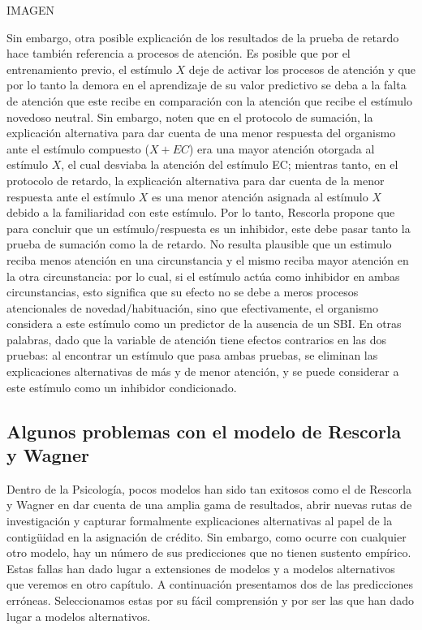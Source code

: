 \documentclass[
  letterpaper,
]{book}
\begin{document}
IMAGEN

Sin embargo, otra posible explicación de los resultados de la prueba de
retardo hace también referencia a procesos de atención. Es posible que
por el entrenamiento previo, el estímulo \(X\) deje de activar los
procesos de atención y que por lo tanto la demora en el aprendizaje de
su valor predictivo se deba a la falta de atención que este recibe en
comparación con la atención que recibe el estímulo novedoso neutral. Sin
embargo, noten que en el protocolo de sumación, la explicación
alternativa para dar cuenta de una menor respuesta del organismo ante el
estímulo compuesto (\(X+EC\)) era una mayor atención otorgada al
estímulo \(X\), el cual desviaba la atención del estímulo EC; mientras
tanto, en el protocolo de retardo, la explicación alternativa para dar
cuenta de la menor respuesta ante el estímulo \(X\) es una menor
atención asignada al estímulo \(X\) debido a la familiaridad con este
estímulo. Por lo tanto, Rescorla propone que para concluir que un
estímulo/respuesta es un inhibidor, este debe pasar tanto la prueba de
sumación como la de retardo. No resulta plausible que un estimulo reciba
menos atención en una circunstancia y el mismo reciba mayor atención en
la otra circunstancia: por lo cual, si el estímulo actúa como inhibidor
en ambas circunstancias, esto significa que su efecto no se debe a meros
procesos atencionales de novedad/habituación, sino que efectivamente, el
organismo considera a este estímulo como un predictor de la ausencia de
un SBI. En otras palabras, dado que la variable de atención tiene
efectos contrarios en las dos pruebas: al encontrar un estímulo que pasa
ambas pruebas, se eliminan las explicaciones alternativas de más y de
menor atención, y se puede considerar a este estímulo como un inhibidor
condicionado.

\subsection{Algunos problemas con el modelo de Rescorla y
Wagner}\label{algunos-problemas-con-el-modelo-de-rescorla-y-wagner}

Dentro de la Psicología, pocos modelos han sido tan exitosos como el de
Rescorla y Wagner en dar cuenta de una amplia gama de resultados, abrir
nuevas rutas de investigación y capturar formalmente explicaciones
alternativas al papel de la contigüidad en la asignación de crédito. Sin
embargo, como ocurre con cualquier otro modelo, hay un número de sus
predicciones que no tienen sustento empírico. Estas fallas han dado
lugar a extensiones de modelos y a modelos alternativos que veremos en
otro capítulo. A continuación presentamos dos de las predicciones
erróneas. Seleccionamos estas por su fácil comprensión y por ser las que
han dado lugar a modelos alternativos.
\end{document}
